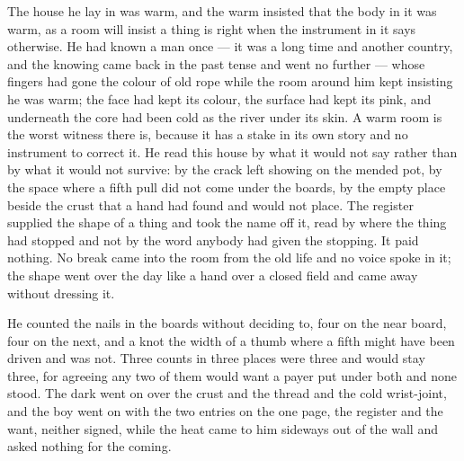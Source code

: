 The house he lay in was warm, and the warm insisted that the body in it was warm, as a room will insist a thing is right when the instrument in it says otherwise. He had known a man once --- it was a long time and another country, and the knowing came back in the past tense and went no further --- whose fingers had gone the colour of old rope while the room around him kept insisting he was warm; the face had kept its colour, the surface had kept its pink, and underneath the core had been cold as the river under its skin. A warm room is the worst witness there is, because it has a stake in its own story and no instrument to correct it. He read this house by what it would not say rather than by what it would not survive: by the crack left showing on the mended pot, by the space where a fifth pull did not come under the boards, by the empty place beside the crust that a hand had found and would not place. The register supplied the shape of a thing and took the name off it, read by where the thing had stopped and not by the word anybody had given the stopping. It paid nothing. No break came into the room from the old life and no voice spoke in it; the shape went over the day like a hand over a closed field and came away without dressing it.

He counted the nails in the boards without deciding to, four on the near board, four on the next, and a knot the width of a thumb where a fifth might have been driven and was not. Three counts in three places were three and would stay three, for agreeing any two of them would want a payer put under both and none stood. The dark went on over the crust and the thread and the cold wrist-joint, and the boy went on with the two entries on the one page, the register and the want, neither signed, while the heat came to him sideways out of the wall and asked nothing for the coming.

\scenebreak


